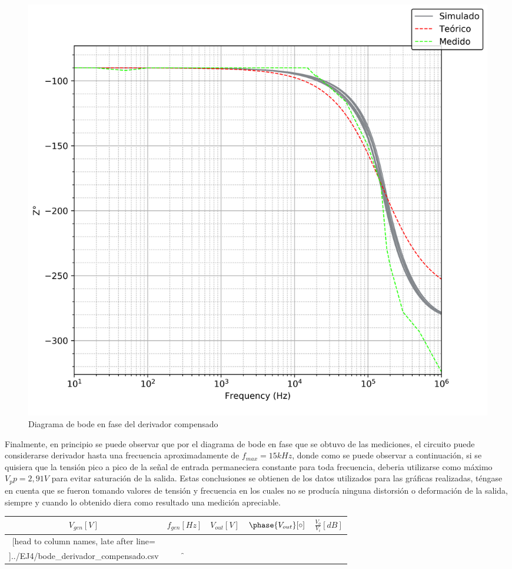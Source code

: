 \begin{figure}[H]
	\centering
	\includegraphics[scale=0.6]{../EJ4/Recursos/Derivador_compensado/bode_fase.png}
	\caption{Diagrama de bode en fase del derivador compensado}
	\label{fig:derivador_compensado_bode_fase}
\end{figure}

Finalmente, en principio se puede observar que por el diagrama de bode en fase que se obtuvo de las mediciones,
el circuito puede considerarse derivador hasta una frecuencia aproximadamente de $f_{max} = 15kHz$, donde como se puede
observar a continuaci\'on, si se quisiera que la tensi\'on pico a pico de la se\~nal de entrada permaneciera constante para toda
frecuencia, deberia utilizarse como m\'aximo $V_pp = 2,91 V$ para evitar saturaci\'on de la salida. Estas conclusiones se obtienen de los datos
utilizados para las gr\'aficas realizadas, t\'engase en cuenta que se fueron tomando valores de tensi\'on y frecuencia en los cuales no se produc\'ia
ninguna distorsi\'on o deformaci\'on de la salida, siempre y cuando lo obtenido diera como resultado una medici\'on apreciable.

\begin{table}[H]
	\centering
	\begin{tabular}{c c c c c}%
		$V_{gen} [V]$ & $f_{gen} [Hz]$ & $V_{out} [V]$ & $\phase{V_{out}} [\circ]$ & $\frac{V_o}{V_i} [dB]$ \\ \hline
		\csvreader[head to column names, late after line=\\]{../EJ4/bode_derivador_compensado.csv}{}{\gen & \f & \out & \p & \db}
		\hline
	\end{tabular}
\end{table}

